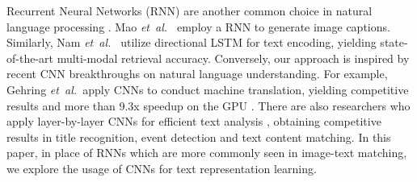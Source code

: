 \documentclass[10pt,final,journal]{IEEEtran}
\newcommand{\etal}{\mbox{\emph{et al.\ }}}
\begin{document}
Recurrent Neural Networks (RNN) are another common choice in natural language processing \cite{mikolov2010recurrent,wu2016google}. Mao \etal \cite{mao2014deep} employ a RNN to generate image captions. Similarly, Nam \etal \cite{nam2016dual} utilize directional LSTM \cite{hochreiter1997long} for text encoding, yielding state-of-the-art multi-modal retrieval accuracy. Conversely, our approach is inspired by recent CNN breakthroughs on natural language understanding. For example, Gehring \etal apply CNNs to conduct machine translation, yielding competitive results and more than 9.3x speedup on the GPU \cite{gehring2017convolutional}. There are also researchers who apply layer-by-layer CNNs for efficient text analysis \cite{hu2014convolutional,kim2014convolutional,zhang2015character,chen2015event}, obtaining competitive results in title recognition, event detection and text content matching. In this paper, in place of RNNs which are more commonly seen in image-text matching, we explore the usage of CNNs for text representation learning. 
\end{document}
